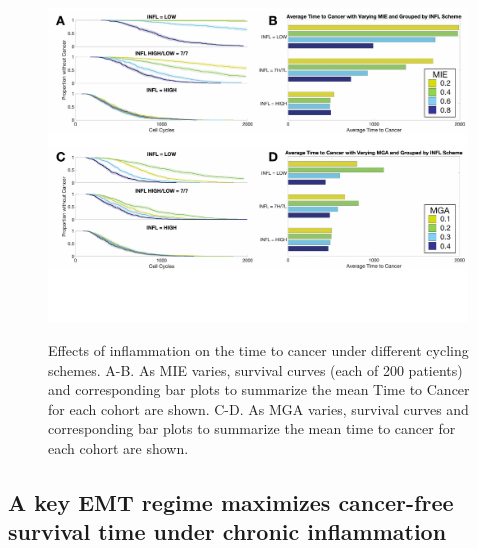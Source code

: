 \documentclass[11pt]{article}
\begin{document}
\begin{figure}
\center
{\includegraphics[width=0.99\textwidth]{Figure4/Figure4.pdf}}
\caption{Effects of inflammation on the time to cancer under different cycling schemes. A-B. As MIE varies, survival curves (each of 200 patients)  and corresponding bar plots to summarize the mean Time to Cancer for each cohort are shown. C-D. As MGA varies, survival curves  and corresponding bar plots to summarize the mean time to cancer for each cohort are shown.}
\label{fig:VaryINFL_and_MesPars}
\end{figure}



\subsection{A key EMT regime maximizes cancer-free survival time under chronic inflammation}\label{KeyEMT}
\end{document}
